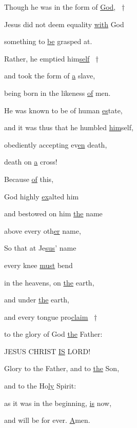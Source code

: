 \noindent Though he was in the form of \uline{God}, ~†~\nopagebreak

Jesus did not deem equality \uline{with} God ~\GreStar{}~\nopagebreak

something to \uline{be} grasped at.

\noindent Rather, he emptied him\uline{self} ~†~\nopagebreak

and took the form of \uline{a} slave, ~\GreStar{}~\nopagebreak

being born in the likeness \uline{of} men.

\noindent He was known to be of human \uline{es}tate, ~\GreStar{}~\nopagebreak

and it was thus that he humbled \uline{him}self,

\noindent obediently accepting ev\uline{en} death, ~\GreStar{}~\nopagebreak

death on \uline{a} cross!

\noindent Because \uline{of} this, ~\GreStar{}~\nopagebreak

God highly \uline{ex}alted him

\noindent and bestowed on him \uline{the} name ~\GreStar{}~\nopagebreak

above every oth\uline{er} name,

\noindent So that at Je\uline{sus}’ name~\GreStar{}~\nopagebreak

every knee \uline{must} bend

\noindent in the heavens, on \uline{the} earth, ~\GreStar{}~\nopagebreak

and under \uline{the} earth,

\noindent and every tongue pro\uline{claim} ~†~\nopagebreak

to the glory of God \uline{the} Father: ~\GreStar{}~\nopagebreak

JESUS CHRIST \uline{IS} LORD!

\noindent Glory to the Father, and to \uline{the} Son,~\GreStar{}~\nopagebreak

and to the Ho\uline{ly} Spirit:

\noindent as it was in the beginning, \uline{is} now,~\GreStar{}~\nopagebreak

and will be for ever. \uline{A}men.
